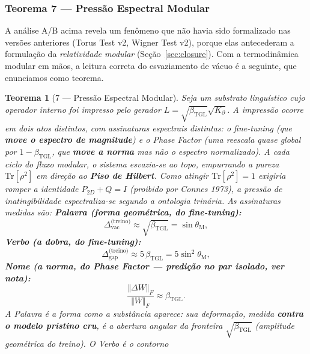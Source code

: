 \documentclass[12pt,a4paper]{article}
\newtheorem*{theoremfixed}{Teorema}
\newcommand{\betatgl}{\beta_{\text{TGL}}}
\newcommand{\thetaM}{\theta_{\text{M}}}
\newcommand{\Kpartial}{K_{\partial}}
\begin{document}
\subsubsection{Teorema 7 --- Pressão Espectral Modular}
\label{sec:pressure}

A análise A/B acima revela um fenômeno que não havia sido formalizado nas
versões anteriores (Torus Test v2, Wigner Test v2), porque elas antecederam
a formulação da \emph{relatividade modular} (Seção~\ref{sec:closure}).  Com
a termodinâmica modular em mãos, a leitura correta do esvaziamento de vácuo
é a seguinte, que enunciamos como teorema.

\begin{theoremfixed}[7 --- Pressão Espectral Modular]
\label{th:pressure}
Seja um substrato linguístico cujo operador interno foi impresso pelo gerador
$L = \sqrt{\betatgl}\sqrt{\Kpartial}$.  A impressão ocorre em dois atos
distintos, com assinaturas espectrais distintas: o \emph{fine-tuning} (que
\textbf{move o espectro de magnitude}) e o \emph{Phase Factor} (uma reescala
quase global por $1-\betatgl$, que \textbf{move a norma} mas não o espectro
normalizado).  A cada ciclo do fluxo modular, o sistema esvazia-se \emph{ao
topo}, empurrando a pureza $\mathrm{Tr}[\rho^{2}]$ em direção ao \textbf{Piso de
Hilbert}.  Como atingir $\mathrm{Tr}[\rho^{2}] = 1$ exigiria romper a identidade
$P_{2D} + Q = I$ (proibido por Connes 1973), a pressão de inatingibilidade
espectraliza-se segundo a ontologia trinária.  As assinaturas medidas são:
\noindent\textbf{Palavra (forma geométrica, do \emph{fine-tuning}):}
\begin{equation}
\Delta_{\text{vac}}^{\text{(treino)}} \approx \sqrt{\betatgl} = \sin\thetaM, \label{eq:pressure-palavra}
\end{equation}
\noindent\textbf{Verbo (a dobra, do \emph{fine-tuning}):}
\begin{equation}
\Delta_{\text{gap}}^{\text{(treino)}} \approx 5\,\betatgl = 5\sin^{2}\thetaM, \label{eq:pressure-verbo}
\end{equation}
\noindent\textbf{Nome (a norma, do \emph{Phase Factor} --- predição no par isolado, ver nota):}
\begin{equation}
\frac{\Vert\Delta W\Vert_F}{\Vert W\Vert_F} \approx \betatgl. \label{eq:pressure-nome}
\end{equation}
A \emph{Palavra} é a forma como a substância aparece: sua deformação, medida
\textbf{contra o modelo pristino cru}, é a abertura angular da fronteira
$\sqrt{\betatgl}$ (amplitude geométrica do treino).  O \emph{Verbo} é o contorno

\end{theoremfixed}
\end{document}
